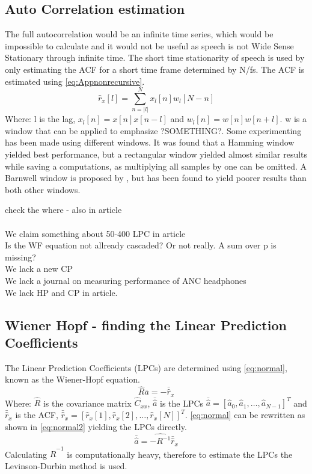 \subsection{Auto Correlation estimation}
The full autocorrelation would be an infinite time series, which would be impossible to calculate and it would not be useful as speech is not Wide Sense Stationary through infinite time. The short time stationarity of speech is used by only estimating the ACF for a short time frame determined by N/fs. The ACF is estimated using \autoref{eq:Appnonrecursive}.
\begin{equation}\label{eq:Appnonrecursive}
\hat{r}_x[l] = \sum^{N}_{n=\left| l\right|} x_l[n]w_l[N-n]
\end{equation}
Where: l is the lag, $x_l[n]=x[n]x[n-l]$ and $w_l[n]=w[n]w[n+l]$. w is a window that can be applied to emphasize ?SOMETHING?. Some experimenting has been made using different windows. It was found that a Hamming window yielded best performance, but a rectangular window yielded almost similar results while saving a computations, as multiplying all samples by one can be omitted. A Barnwell window is proposed by \cite{Speech}, but has been found to yield poorer results than both other windows.   


check the where - also in article\\\\
We claim something about 50-400 LPC in article\\
Is the WF equation not allready cascaded? Or not really. A sum over p is missing?\\
We lack a new CP\\
We lack a journal on measuring performance of ANC headphones\\
We lack HP and CP in article.\\


\subsection{ Wiener Hopf - finding the Linear Prediction Coefficients}
 The Linear Prediction Coefficients (LPCs) are determined using \autoref{eq:normal}, known as the Wiener-Hopf equation.
\begin{equation}\label{eq:normal}
\hat{R}  \bar{a} = -\bar{\hat{r}}_x
\end{equation}
Where: $\hat{R}$ is the covariance matrix $\hat{C}_{xx}$, $\bar{\hat{a}}$ is the LPCs $\bar{\hat{a}} = [\hat{a}_0 , \hat{a}_1, \dotsc, \hat{a}_{N-1}]^T$ and $\bar{\hat{r}}_x$ is the ACF, $\bar{\hat{r}}_x = [\hat{r}_x[1] , \hat{r}_x[2], \dotsc, \hat{r}_x[N]]^T$. \autoref{eq:normal} can be rewritten as shown in \autoref{eq:normal2} yielding the LPCs directly.  
\begin{equation}\label{eq:normal2}
\bar{\hat{a}} = \hat{-R^{-1}} \bar{\hat{r}}_x
\end{equation}
Calculating $\hat{R}^{-1}$ is computationally heavy, therefore to estimate the LPCs the Levinson-Durbin method is used. 

